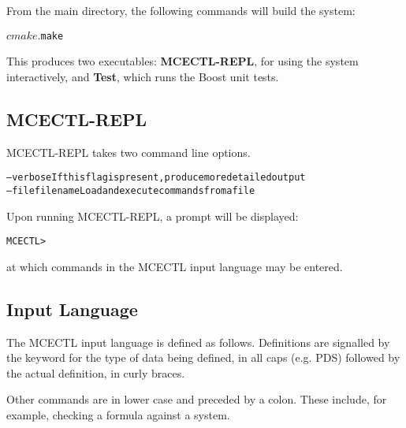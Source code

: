 \documentclass[11pt]{article}
\theoremstyle{definition}
\begin{document}
From the main directory, the following commands will build the system:
\begin{alltt}
$ cmake .
$ make
\end{alltt}

This produces two executables: \textbf{MCECTL-REPL}, for using the system
interactively, and \textbf{Test}, which runs the Boost unit tests. 

\subsection{MCECTL-REPL}

MCECTL-REPL takes two command line options.
\begin{alltt}
--verbose         If this flag is present, produce more detailed output
--file filename   Load and execute commands from a file
\end{alltt}

Upon running MCECTL-REPL, a prompt will be displayed:
\begin{alltt}
MCECTL >
\end{alltt}
at which commands in the MCECTL input language may be entered.

\subsection{Input Language}

The MCECTL input language is defined as follows.
Definitions are signalled by the keyword for the type of data being defined, in
all caps (e.g. PDS) followed by the actual definition, in curly braces.

Other commands are in lower case and preceded by a colon. These include, for
example, checking a formula against a system.
\end{document}
